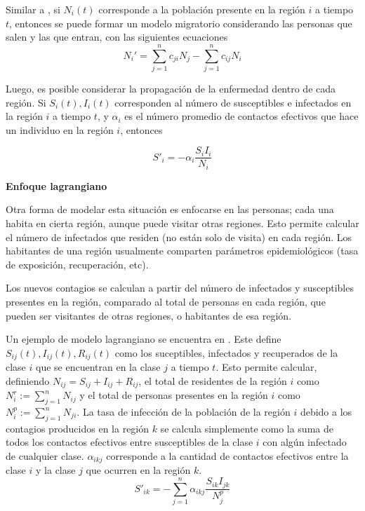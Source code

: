 Similar a \cite{Cosner2009}, si \(N_i(t)\) corresponde a la población presente en la región \(i\) a tiempo \(t\), entonces se puede formar un modelo migratorio considerando las personas que salen y las que entran, con las siguientes ecuaciones
\[
N_i' = \sum_{j = 1}^n c_{ji} N_j - \sum_{j = 1}^n c_{ij} N_i
\]

Luego, es posible considerar la propagación de la enfermedad dentro de cada región. Si \(S_{i}(t), I_i(t)\) corresponden al número de susceptibles e infectados en la región \(i\) a tiempo \(t\), y \(\alpha_{i}\) es el número promedio de contactos efectivos que hace un individuo en la región \(i\), entonces 

\[
S'_i = - \alpha_i\frac{S_iI_i}{N_i}
\]

\noindent \textbf{Enfoque lagrangiano}

Otra forma de modelar esta situación es enfocarse en las personas; cada una habita en cierta región, aunque puede visitar otras regiones. Esto permite calcular el número de infectados que residen (no están solo de visita) en cada región. Los habitantes de una región usualmente comparten parámetros epidemiológicos (tasa de exposición, recuperación, etc). 

Los nuevos contagios se calculan a partir del número de infectados y susceptibles presentes en la región, comparado al total de personas en cada región, que pueden ser visitantes de otras regiones, o habitantes de esa región.

Un ejemplo de modelo lagrangiano se encuentra en \cite{Ruan2006}. Este define \(S_{ij}(t), I_{ij}(t), R_{ij}(t)\) como los suceptibles, infectados y recuperados de la clase \(i\) que se encuentran en la clase \(j\) a tiempo \(t\).  Esto permite calcular, definiendo \(N_{ij} = S_{ij} + I_{ij} + R_{ij}\), el total de residentes de la región \(i\) como \(N^r_i := \sum_{j = 1}^n N_{ij}\) y el total de personas presentes en la región \(i\) como \(N^p_i := \sum_{j = 1}^n N_{ji}\). La tasa de infección de la población de la región \(i\) debido a los contagios producidos en la región \(k\) se calcula simplemente como la suma de todos los contactos efectivos entre susceptibles de la clase \(i\) con algún infectado de cualquier clase. \(\alpha_{ikj}\) corresponde a la cantidad de contactos efectivos entre la clase \(i\) y la clase \(j\) que ocurren en la región \(k\).
\[
S'_{ik} = -\sum_{j = 1}^n \alpha_{ikj} \frac{S_{ik}I_{jk}}{N^p_j}
\]

